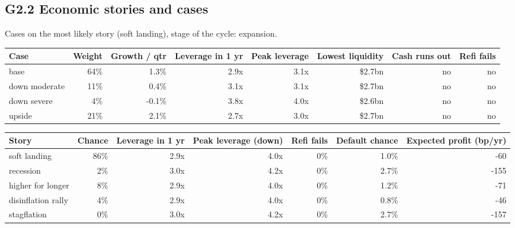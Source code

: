 \documentclass[11pt,a4paper]{article}
\begin{document}
\subsection*{G2.2 Economic stories and cases}
Cases on the most likely story (soft landing), stage of the cycle: expansion.
\begin{center}\scriptsize\setlength{\tabcolsep}{3.5pt}\begin{tabular}{@{}lrrrrrrr@{}}\toprule
Case & Weight & Growth / qtr & Leverage in 1 yr & Peak leverage & Lowest liquidity & Cash runs out & Refi fails \\\midrule
base & 64\% & 1.3\% & 2.9x & 3.1x & \$2.7bn & no & no \\
down moderate & 11\% & 0.4\% & 3.1x & 3.1x & \$2.7bn & no & no \\
down severe & 4\% & -0.1\% & 3.8x & 4.0x & \$2.6bn & no & no \\
upside & 21\% & 2.1\% & 2.7x & 3.0x & \$2.7bn & no & no \\
\bottomrule\end{tabular}\end{center}
\begin{center}\scriptsize\setlength{\tabcolsep}{3.5pt}\begin{tabular}{@{}lrrrrrr@{}}\toprule
Story & Chance & Leverage in 1 yr & Peak leverage (down) & Refi fails & Default chance & Expected profit (bp/yr) \\\midrule
soft landing & 86\% & 2.9x & 4.0x & 0\% & 1.0\% & -60 \\
recession & 2\% & 3.0x & 4.2x & 0\% & 2.7\% & -155 \\
higher for longer & 8\% & 2.9x & 4.0x & 0\% & 1.2\% & -71 \\
disinflation rally & 4\% & 2.9x & 4.0x & 0\% & 0.8\% & -46 \\
stagflation & 0\% & 3.0x & 4.2x & 0\% & 2.7\% & -157 \\
\bottomrule\end{tabular}\end{center}
\end{document}
